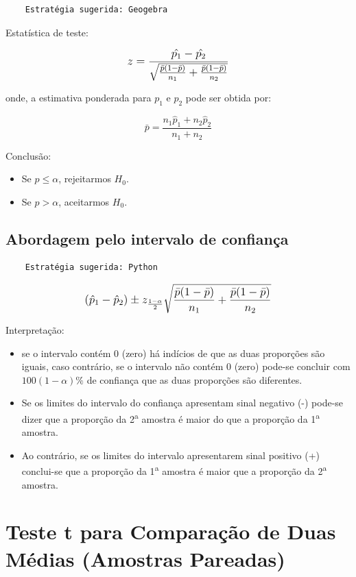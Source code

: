 \begin{verbatim}
	Estratégia sugerida: Geogebra 
\end{verbatim}

Estatística de teste:

\[\beq{ z = \frac{\hat{p_1}-\hat{p_2}}{\sqrt{\frac{\bar{p}(1-\bar{p})}{n_1}+\frac{\bar{p}(1-\bar{p})}{n_2}} }}\]

onde, a estimativa ponderada para \(p_1\) e \(p_2\) pode ser obtida por:

\[\bar{p}=\frac{n_1\hat{p}_1 + n_2\hat{p}_2}{n_1+n_2}\]

Conclusão:
\begin{itemize}
	\item Se \(p \leq \alpha\), rejeitarmos \(H_0\).
	\item Se \(p > \alpha\), aceitarmos \(H_0\).
\end{itemize}

\subsection{Abordagem pelo intervalo de confiança}

\begin{verbatim}
	Estratégia sugerida: Python 
\end{verbatim}

\[\beq{ (\hat{p}_1-\hat{p}_2) \pm z_{\frac{1-\alpha}{2}} \sqrt{\frac{\bar{p}(1-\bar{p})}{n_1}+\frac{\bar{p}(1-\bar{p})}{n_2}} }\]

Interpretação:

\begin{itemize}
	\item se o intervalo contém 0 (zero) há indícios de que as duas proporções são iguais, caso contrário, se o intervalo não contém 0 (zero) pode-se concluir com \( 100(1-\alpha)\% \) de confiança que as duas proporções são diferentes.
		\item Se os limites do intervalo do confiança apresentam sinal negativo (-) pode-se dizer que a proporção da 2\textsuperscript{a} amostra é maior do que a proporção da 1\textsuperscript{a} amostra.
	\item Ao contrário, se os limites do intervalo apresentarem sinal positivo (+) conclui-se que a proporção da 1\textsuperscript{a} amostra é maior que a proporção da 2\textsuperscript{a} amostra.
\end{itemize}

\section{Teste t para Comparação de Duas Médias (Amostras Pareadas)}

